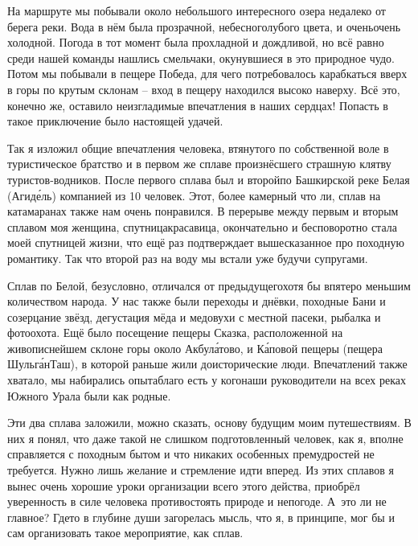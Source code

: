 На маршруте мы побывали около небольшого интересного озера недалеко от берега реки. Вода в нём была прозрачной, небесно\sdash голубого цвета, и очень\sdash очень холодной. Погода в тот момент была прохладной и дождливой, но всё равно среди нашей команды нашлись смельчаки, окунувшиеся в это природное чудо. Потом мы побывали в пещере Победа, для чего потребовалось карабкаться вверх в горы по крутым склонам – вход в пещеру находился высоко наверху. Всё это, конечно же, оставило неизгладимые впечатления в наших сердцах! Попасть в такое приключение было настоящей удачей.

Так я изложил общие впечатления человека, втянутого по собственной воле в туристическое братство и в первом же сплаве произнёсшего страшную клятву туристов-водников. После первого сплава был и второй\mdash по Башкирской реке Белая (Агид\'{е}ль) компанией из 10 человек. Этот, более камерный что ли, сплав на катамаранах также нам очень понравился. В перерыве между первым и вторым сплавом моя женщина, спутница\sdash красавица, окончательно и бесповоротно стала моей спутницей жизни, что ещё раз подтверждает вышесказанное про походную романтику. Так что второй раз на воду мы встали уже будучи супругами.

Сплав по Белой, безусловно, отличался от предыдущего\mdash хотя бы впятеро меньшим количеством народа. У нас также были переходы и днёвки, походные Бани и созерцание звёзд, дегустация мёда и медовухи с местной пасеки, рыбалка и фотоохота. Ещё было посещение пещеры Сказка, расположенной на живописнейшем склоне горы около Акбул\'{а}тово, и К\'{а}повой пещеры (пещера Шульг\'{а}н\sdash Таш), в которой раньше жили доисторические люди. Впечатлений также хватало, мы набирались опыта\mdash благо есть у кого\mdash наши руководители на всех реках Южного Урала были как родные.

Эти два сплава заложили, можно сказать, основу будущим моим путешествиям. В них я понял, что даже такой не слишком подготовленный человек, как я, вполне справляется с походным бытом и что никаких особенных премудростей не требуется. Нужно лишь желание и стремление идти вперед. Из этих сплавов я вынес очень хорошие уроки организации всего этого действа, приобрёл уверенность в силе человека противостоять природе и непогоде. А~это ли не главное? Где\sdash то в глубине души загорелась мысль, что я, в принципе, мог бы и сам организовать такое мероприятие, как сплав.

\begin{center}
\end{center}
